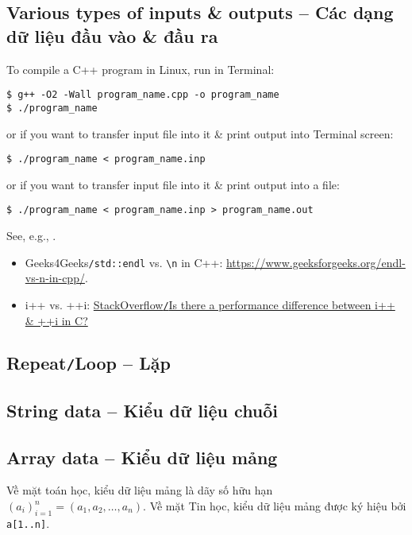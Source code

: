 \documentclass{article}
\begin{document}
\subsection{Various types of inputs \& outputs -- Các dạng dữ liệu đầu vào \& đầu ra}
To compile a C++ program in Linux, run in Terminal:
\begin{verbatim}
$ g++ -O2 -Wall program_name.cpp -o program_name
$ ./program_name
\end{verbatim}
or if you want to transfer input file into it \& print output into Terminal screen:
\begin{verbatim}
$ ./program_name < program_name.inp
\end{verbatim}
or if you want to transfer input file into it \& print output into a file:
\begin{verbatim}
$ ./program_name < program_name.inp > program_name.out
\end{verbatim}
See, e.g., \cite{Laaksonen2020}.

\begin{itemize}
	\item Geeks4Geeks{\tt/std::endl} vs. \verb|\n| in C++: \url{https://www.geeksforgeeks.org/endl-vs-n-in-cpp/}. 
	\item i++ vs. ++i: \href{https://stackoverflow.com/questions/24886/is-there-a-performance-difference-between-i-and-i-in-c}{StackOverflow{\tt/}Is there a performance difference between i++ \& ++i in C?}
\end{itemize}

\subsection{Repeat{\tt/}Loop -- Lặp}

\subsection{String data -- Kiểu dữ liệu chuỗi}


\subsection{Array data -- Kiểu dữ liệu mảng}
Về mặt toán học, kiểu dữ liệu mảng là dãy số hữu hạn $(a_i)_{i=1}^n = (a_1,a_2,\ldots,a_n)$. Về mặt Tin học, kiểu dữ liệu mảng được ký hiệu bởi {\tt a[1..n]}.
\end{document}
